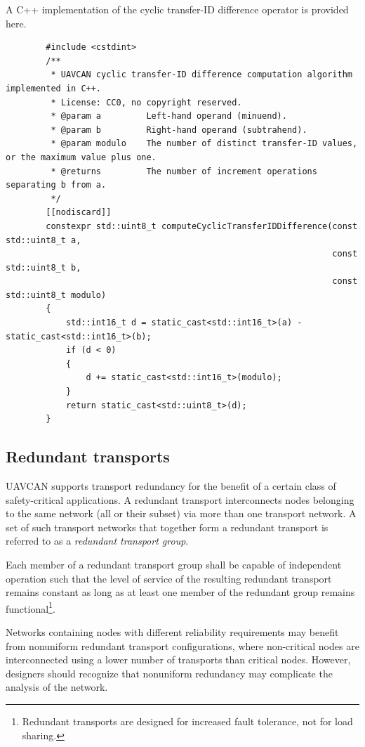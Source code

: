 \begin{remark}
    A C++ implementation of the cyclic transfer-ID difference operator is provided here.
    \begin{verbatim}
        #include <cstdint>
        /**
         * UAVCAN cyclic transfer-ID difference computation algorithm implemented in C++.
         * License: CC0, no copyright reserved.
         * @param a         Left-hand operand (minuend).
         * @param b         Right-hand operand (subtrahend).
         * @param modulo    The number of distinct transfer-ID values, or the maximum value plus one.
         * @returns         The number of increment operations separating b from a.
         */
        [[nodiscard]]
        constexpr std::uint8_t computeCyclicTransferIDDifference(const std::uint8_t a,
                                                                 const std::uint8_t b,
                                                                 const std::uint8_t modulo)
        {
            std::int16_t d = static_cast<std::int16_t>(a) - static_cast<std::int16_t>(b);
            if (d < 0)
            {
                d += static_cast<std::int16_t>(modulo);
            }
            return static_cast<std::uint8_t>(d);
        }
    \end{verbatim}
\end{remark}

\subsection{Redundant transports}

UAVCAN supports transport redundancy for the benefit of a certain class of safety-critical applications.
A redundant transport interconnects nodes belonging to the same network (all or their subset)
via more than one transport network.
A set of such transport networks that together form a redundant transport is referred to as a
\emph{redundant transport group}.

Each member of a redundant transport group shall be capable of independent operation
such that the level of service of the resulting redundant transport remains constant
as long as at least one member of the redundant group remains functional\footnote{%
    Redundant transports are designed for increased fault tolerance, not for load sharing.
}.

\begin{remark}
    Networks containing nodes with different reliability requirements may benefit from
    nonuniform redundant transport configurations, where non-critical nodes are interconnected
    using a lower number of transports than critical nodes.
    However, designers should recognize that nonuniform redundancy may complicate the analysis of the network.
\end{remark}

